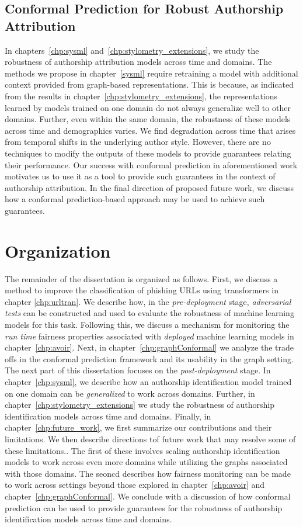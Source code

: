 \subsection{Conformal Prediction for Robust Authorship Attribution}
In chapters~\ref{chp:sysml} and~\ref{chp:stylometry_extensions}, we study the robustness of authorship attribution models across time and domains.
The methods we propose in chapter~\ref{sysml} require retraining a model with additional context provided from graph-based representations.
This is because, as indicated from the results in chapter~\ref{chp:stylometry_extensions}, the representations learned by models trained on one domain do not always generalize well to other domains.
Further, even within the same domain, the robustness of these models across time and demographics varies.
We find degradation across time that arises from temporal shifts in the underlying author style.
However, there are no techniques to modify the outputs of these models to provide guarantees relating their performance.
Our success with conformal prediction in aforementioned work motivates us to use it as a tool to provide such guarantees in the context of authorship attribution.
In the final direction of proposed future work, we discuss how a conformal prediction-based approach may be used to achieve such guarantees.


\section{Organization}
The remainder of the dissertation is organized as follows. 
First, we discuss a method to improve the classification of phishing URLs using transformers in chapter \ref{chp:urltran}.
We describe how, in the \textit{pre-deployment} stage, \textit{adversarial tests} can be constructed and used to evaluate the robustness of machine learning models for this task.
Following this, we discuss a mechanism for monitoring the \textit{run time} fairness properties associated with \textit{deployed} machine learning models in chapter~\ref{chp:avoir}.
Next, in chapter~\ref{chp:graphConformal} we analyze the trade offs in the conformal prediction framework and its usability in the graph setting.
The next part of this dissertation focuses on the \emph{post-deployment} stage.
In chapter~\ref{chp:sysml}, we describe how an authorship identification model trained on one domain can be \textit{generalized} to work across domains.
Further, in chapter~\ref*{chp:stylometry_extensions} we study the robustness of authorship identification models across time and domains.
Finally, in chapter~\ref{chp:future_work}, we first summarize our contributions and their limitations.
We then describe directions tof future work that may resolve some of these limitations..
The first of these involves scaling authorship identification models to work across even more domains while utilizing the graphs associated with those domains.
The seoncd describes how fairness monitoring can be made to work across settings beyond those explored in chapter~\ref{chp:avoir} and chapter~\ref{chp:graphConformal}.
We conclude with a discussion of how conformal prediction can be used to provide guarantees for the robustness of authorship identification models across time and domains.


\endinput